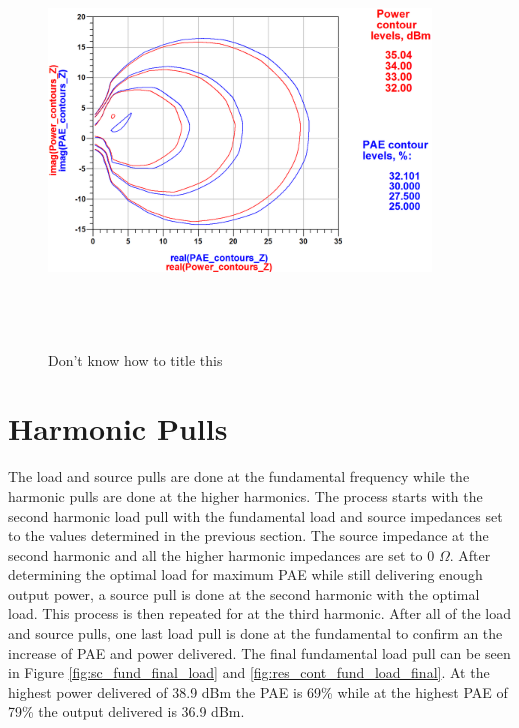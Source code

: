 \begin{figure}
  \centering
  \includegraphics[width=4in,height=4in,keepaspectratio]{figures/simulation/res_fund_source}\\
  \caption{Don't know how to title this}
  \label{fig:xy_fund_source}
\end{figure}


\section{Harmonic Pulls}

The load and source pulls are done at the fundamental frequency while the harmonic pulls are done at the higher harmonics. The process starts with the second harmonic load pull with the fundamental load and source impedances set to the values determined in the previous section. The source impedance at the second harmonic and all the higher harmonic impedances are set to 0 $\Omega$. After determining the optimal load for maximum PAE while still delivering enough output power, a source pull is done at the second harmonic with the optimal load. This process is then repeated for at the third harmonic. After all of the load and source pulls, one last load pull is done at the fundamental to confirm an the increase of PAE and power delivered. The final fundamental load pull can be seen in Figure \ref{fig:sc_fund_final_load} and \ref{fig:res_cont_fund_load_final}. At the highest power delivered of 38.9 dBm the PAE is 69\% while at the highest PAE of 79\% the output delivered is 36.9 dBm.

